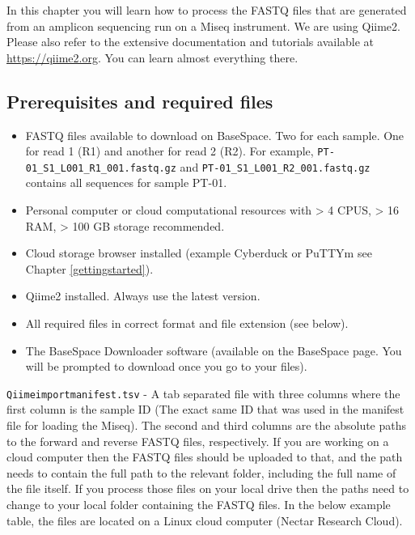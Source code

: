 \documentclass[
]{book}
\providecommand{\tightlist}{%
  \setlength{\itemsep}{0pt}\setlength{\parskip}{0pt}}
\begin{document}
In this chapter you will learn how to process the FASTQ files that are generated from an amplicon sequencing run on a Miseq instrument. We are using Qiime2. Please also refer to the extensive documentation and tutorials available at \url{https://qiime2.org}. You can learn almost everything there.

\hypertarget{prerequisites-and-required-files}{%
\subsection{Prerequisites and required files}\label{prerequisites-and-required-files}}

\begin{itemize}
\tightlist
\item
  FASTQ files available to download on BaseSpace. Two for each sample. One for read 1 (R1) and another for read 2 (R2). For example, \texttt{PT-01\_S1\_L001\_R1\_001.fastq.gz} and \texttt{PT-01\_S1\_L001\_R2\_001.fastq.gz} contains all sequences for sample PT-01.
\item
  Personal computer or cloud computational resources with \textgreater{} 4 CPUS, \textgreater{} 16 RAM, \textgreater{} 100 GB storage recommended.\\
\item
  Cloud storage browser installed (example Cyberduck or PuTTYm see Chapter \ref{gettingstarted}).\\
\item
  Qiime2 installed. Always use the latest version.\\
\item
  All required files in correct format and file extension (see below).\\
\item
  The BaseSpace Downloader software (available on the BaseSpace page. You will be prompted to download once you go to your files).
\end{itemize}

\texttt{Qiimeimportmanifest.tsv} - A tab separated file with three columns where the first column is the sample ID (The exact same ID that was used in the manifest file for loading the Miseq). The second and third columns are the absolute paths to the forward and reverse FASTQ files, respectively. If you are working on a cloud computer then the FASTQ files should be uploaded to that, and the path needs to contain the full path to the relevant folder, including the full name of the file itself. If you process those files on your local drive then the paths need to change to your local folder containing the FASTQ files. In the below example table, the files are located on a Linux cloud computer (Nectar Research Cloud).
\end{document}
